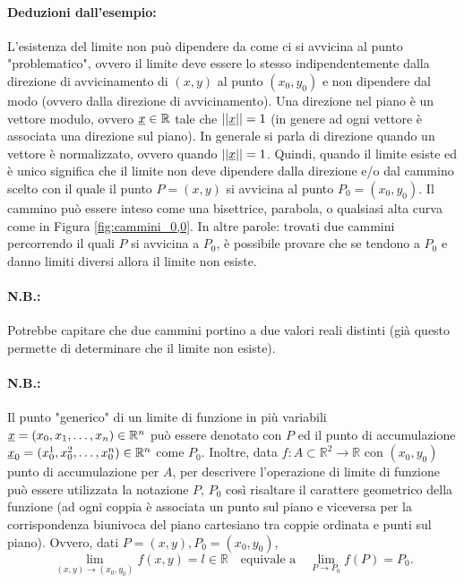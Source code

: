 \paragraph{Deduzioni dall'esempio:} L'esistenza del limite non può dipendere da come ci si avvicina al punto "problematico", ovvero il limite deve essere lo stesso indipendentemente dalla direzione di avvicinamento di $(x,y)$ al punto $(x_0, y_0)$ e non dipendere dal modo (ovvero dalla direzione di avvicinamento). Una direzione nel piano è un vettore modulo, ovvero $\uline x\in\mathbb R$ tale che $||\uline x||=1$ (in genere ad ogni vettore è associata una direzione sul piano).  In generale si parla di direzione quando un vettore è normalizzato, ovvero quando $||\uline x||=1$. Quindi, quando il limite esiste ed è unico significa che il limite non deve dipendere dalla direzione e/o dal cammino scelto con il quale il punto $P=(x,y)$ si avvicina al punto $P_0=(x_0,y_0)$.  Il cammino può essere inteso come una bisettrice, parabola, o qualsiasi alta curva come in Figura \ref{fig:cammini_0,0}. In altre parole: trovati due cammini percorrendo il quali $P$ si avvicina a $P_0$, è possibile provare che se tendono a $P_0$ e danno limiti diversi allora il limite non esiste.

\paragraph{N.B.:} Potrebbe capitare che due cammini portino a due valori reali distinti (già questo permette di determinare che il limite non esiste).

\paragraph{N.B.:} Il punto "generico" di un limite di funzione in più variabili $\uline x=(x_0,x_1,\hdots, x_n)\in\mathbb R^n$ può essere denotato con $P$ ed il punto di accumulazione $\uline x_0=(x_0^1,x_0^2,\hdots, x_0^n)\in\mathbb R^n$ come $P_0$. Inoltre, data $f:A\subset\mathbb R^2\rightarrow\mathbb R$ con $(x_0,y_0)$ punto di accumulazione per $A$, per descrivere l'operazione di limite di funzione può essere utilizzata la notazione $P,\, P_0$ così risaltare il carattere geometrico della funzione (ad ogni coppia è associata un punto sul piano e viceversa per la corrispondenza biunivoca del piano cartesiano tra coppie ordinata e punti sul piano). Ovvero, dati $P=(x,y), P_0=(x_0,y_0)$,
\begin{equation*}
    \lim\limits_{(x,y)\rightarrow(x_0,y_0)}f(x,y)=l\in\mathbb R \quad\text{equivale a}\quad \lim\limits_{P\rightarrow P_0}f(P)=P_0.
\end{equation*}


